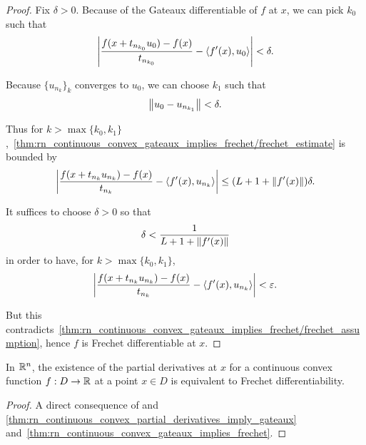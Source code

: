 \begin{proof}
  Fix $\delta > 0$. Because of the Gateaux differentiable of $f$ at $x$, we can pick $k_0$ such that
  \begin{align*}
    \left\vert \frac {f(x + t_{n_{k_0}} u_0) - f(x)} {t_{n_{k_0}}} - \left\langle f'(x), u_0 \right\rangle \right\vert < \delta.
  \end{align*}

  Because $\{ u_{n_k} \}_k$ converges to $u_0$, we can choose $k_1$ such that
  \begin{align*}
    \left\Vert u_0 - u_{n_{k_1}} \right\Vert < \delta.
  \end{align*}

  Thus for $k > \max \{ k_0, k_1 \}$,~\cref{thm:rn_continuous_convex_gateaux_implies_frechet/frechet_estimate} is bounded by
  \begin{align*}
    \left\vert \frac {f(x + t_{n_k} u_{n_k}) - f(x)} {t_{n_k}} - \left\langle f'(x), u_{n_k} \right\rangle \right\vert
    \leq
    (L + 1 + \left\Vert f'(x) \right\Vert) \delta.
  \end{align*}

  It suffices to choose $\delta > 0$ so that
  \begin{align*}
    \delta < \frac 1 {L + 1 + \left\Vert f'(x) \right\Vert}
  \end{align*}
  in order to have, for $k > \max \{ k_0, k_1 \}$,
  \begin{align*}
    \left\vert \frac {f(x + t_{n_k} u_{n_k}) - f(x)} {t_{n_k}} - \left\langle f'(x), u_{n_k} \right\rangle \right\vert < \varepsilon.
  \end{align*}

  But this contradicts~\cref{thm:rn_continuous_convex_gateaux_implies_frechet/frechet_assumption}, hence $f$ is Frechet differentiable at $x$.
\end{proof}

\begin{corollary}\label{thm:rn_continuous_convex_partial_derivatives_imply_frechet}
  In $\mathbb R^n$, the existence of the partial derivatives at $x$ for a continuous convex function $f: D \to \mathbb R$ at a point $x \in D$ is equivalent to Frechet differentiability.
\end{corollary}
\begin{proof}
  A direct consequence of and \cref{thm:rn_continuous_convex_partial_derivatives_imply_gateaux} and~\cref{thm:rn_continuous_convex_gateaux_implies_frechet}.
\end{proof}

